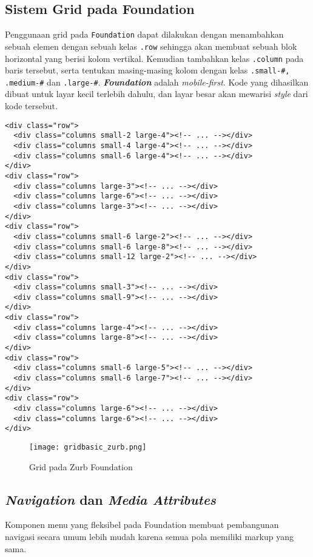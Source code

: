 \begin{enumerate}
\subsection{Sistem Grid pada Foundation}
\label{subs:grid_zurb}
Penggunaan grid pada \texttt{Foundation} dapat dilakukan dengan menambahkan sebuah elemen dengan sebuah kelas \texttt{.row} sehingga akan membuat sebuah blok horizontal yang berisi kolom vertikal. Kemudian tambahkan kelas \texttt{.column} pada baris tersebut, serta tentukan masing-masing kolom dengan kelas \texttt{.small-#, .medium-#} dan \texttt{.large-#}. 
\textbf{\textit{Foundation}} adalah \textit{mobile-first}. Kode yang dihasilkan dibuat untuk layar kecil terlebih dahulu, dan layar besar akan mewarisi \textit{style} dari kode tersebut. \cite{zurbfoundation:17}
\begin{lstlisting}[frame=single] 
<div class="row">
  <div class="columns small-2 large-4"><!-- ... --></div>
  <div class="columns small-4 large-4"><!-- ... --></div>
  <div class="columns small-6 large-4"><!-- ... --></div>
</div>
<div class="row">
  <div class="columns large-3"><!-- ... --></div>
  <div class="columns large-6"><!-- ... --></div>
  <div class="columns large-3"><!-- ... --></div>
</div>
<div class="row">
  <div class="columns small-6 large-2"><!-- ... --></div>
  <div class="columns small-6 large-8"><!-- ... --></div>
  <div class="columns small-12 large-2"><!-- ... --></div>
</div>
<div class="row">
  <div class="columns small-3"><!-- ... --></div>
  <div class="columns small-9"><!-- ... --></div>
</div>
<div class="row">
  <div class="columns large-4"><!-- ... --></div>
  <div class="columns large-8"><!-- ... --></div>
</div>
<div class="row">
  <div class="columns small-6 large-5"><!-- ... --></div>
  <div class="columns small-6 large-7"><!-- ... --></div>
</div>
<div class="row">
  <div class="columns large-6"><!-- ... --></div>
  <div class="columns large-6"><!-- ... --></div>
</div>
\end{lstlisting}

\begin{figure} [H]
	\centering  
	\texttt{[image: gridbasic\_zurb.png]}  
	\caption{Grid pada Zurb Foundation}
	\label{fig:gridbasic_zurb} 
\end{figure}

\subsection{\textit{Navigation} dan \textit{Media Attributes}}
\label{subs:view}
Komponen menu yang fleksibel pada Foundation membuat pembangunan navigasi secara umum lebih mudah karena semua pola memiliki markup yang sama.


\end{enumerate}
